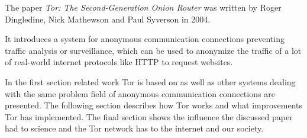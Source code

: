 
The paper \textit{Tor: The Second-Generation Onion Router} \cite{tor2004original} was written by Roger Dingledine, Nick Mathewson and Paul Syverson in 2004. 

It introduces a system for anonymous communication connections preventing traffic analysis or surveillance, which can be used to anonymize the traffic of a lot of real-world internet protocols like HTTP to request websites.





In the first section related work Tor is based on as well as other systems dealing with the same problem field of anonymous communication connections are presented. The following section describes how Tor works and what improvements Tor has implemented. The final section shows the influence the discussed paper had to science and the Tor network has to the internet and our society.